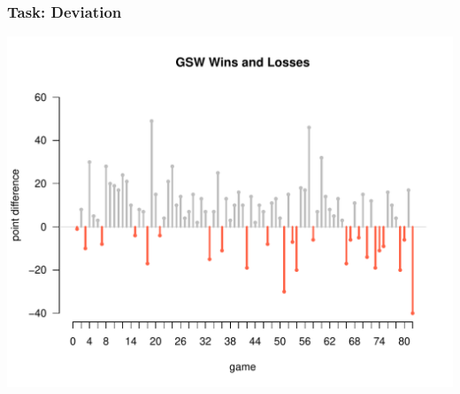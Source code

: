 \documentclass[12pt]{beamer}\usepackage[]{graphicx}\usepackage[]{color}
\makeatletter
\def\maxwidth{ %
  \ifdim\Gin@nat@width>\linewidth
    \linewidth
  \else
    \Gin@nat@width
  \fi
}
\newenvironment{knitrout}{}{} %
\makeatother
\begin{document}
\begin{frame}[fragile]
\frametitle{Task: Deviation}

\begin{knitrout}\footnotesize
{}\color{fgcolor}

{\centering \includegraphics[width=\maxwidth]{figure/task_deviation-1} 

}



\end{knitrout}

\end{frame}

\end{document}
